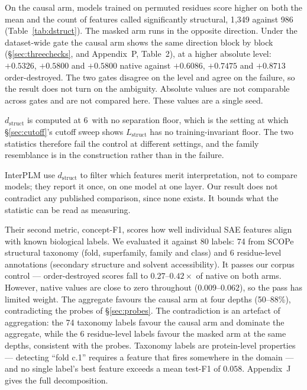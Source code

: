 \documentclass{article} %
\newcommand{\red}[1]{\textcolor{red}{#1}}
\newcommand{\opentag}[1]{\textcolor{red}{\textsuperscript{[\ref{#1}]}}}
\newcommand{\pend}[2]{\red{#1}\opentag{#2}}
\renewcommand{\red}[1]{#1}
\renewcommand{\opentag}[1]{}
\renewcommand{\pend}[2]{#1}
\newcommand{\Lstruct}{\ensuremath{L_{\mathrm{struct}}}}
\newcommand{\dstruct}{\ensuremath{d_{\mathrm{struct}}}}
\newcommand{\angstrom}{\text{\AA}}
\begin{document}
On the causal arm, models trained on permuted residues score higher on both the mean and the count
of features called significantly structural, 1{,}349 against 986 (Table~\ref{tab:dstruct}). The
masked arm runs in the opposite direction. Under the dataset-wide gate the causal arm shows the
same direction block by block (\S\ref{sec:threechecks}, and Appendix~P, Table~2), at a higher
absolute level: $+0.5326$, $+0.5800$ and $+0.5800$ native against $+0.6086$, $+0.7475$ and
$+0.8713$ order-destroyed. The two gates disagree on the level and agree on the
failure, so the result does not turn on the ambiguity. Absolute values are not comparable across
gates and are not compared here. \pend{These values are a single seed.}{t:dstructseeds}

\dstruct{} is computed at 6\,\angstrom{} with no separation floor, which is the setting at which
\S\ref{sec:cutoff}'s cutoff sweep shows \Lstruct{} has no training-invariant floor. The two
statistics therefore fail the control at different settings, and the family resemblance is in the
construction rather than in the failure.

InterPLM use \dstruct{} to filter which features merit interpretation, not to compare models; they
report it once, on one model at one layer. Our result does not contradict any published comparison,
since none exists. It bounds what the statistic can be read as measuring.

Their second metric, concept-F1, scores how well individual SAE features align with known
biological labels. We evaluated it against 80 labels: 74 from SCOPe structural taxonomy (fold,
superfamily, family and class) and 6 residue-level annotations (secondary structure and solvent
accessibility)\opentag{t:conceptswissprot}. It passes our corpus control --- order-destroyed scores fall to $0.27$--$0.42\times$
of native on both arms. However, native values are close to zero throughout ($0.009$--$0.062$), so
the pass has limited weight. \pend{The aggregate favours the causal arm at four depths
(50--88\%), contradicting the probes of \S\ref{sec:probes}. The contradiction is an artefact of
aggregation: the 74 taxonomy labels favour the causal arm and dominate the aggregate, while the 6
residue-level labels favour the masked arm at the same depths, consistent with the probes.
Taxonomy labels are protein-level properties --- detecting ``fold c.1'' requires a feature that
fires somewhere in the domain --- and no single label's best feature exceeds a mean test-F1 of
$0.058$.}{c:conceptdecomp} Appendix~J gives the full decomposition.
\end{document}
